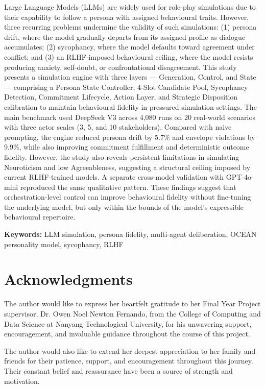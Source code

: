 \documentclass[12pt, a4paper]{report}
\begin{document}
Large Language Models (LLMs) are widely used for role-play simulations due to their capability to follow a persona with assigned behavioural traits. However, three recurring problems undermine the validity of such simulations: (1) persona drift, where the model gradually departs from its assigned profile as dialogue accumulates; (2) sycophancy, where the model defaults toward agreement under conflict; and (3) an RLHF-imposed behavioural ceiling, where the model resists producing anxiety, self-doubt, or confrontational disagreement. This study presents a simulation engine with three layers --- Generation, Control, and State --- comprising a Persona State Controller, 4-Slot Candidate Pool, Sycophancy Detection, Commitment Lifecycle, Action Layer, and Strategic Disposition calibration to maintain behavioural fidelity in pressured simulation settings. The main benchmark used DeepSeek V3 across 4,080 runs on 20 real-world scenarios with three actor scales (3, 5, and 10 stakeholders). Compared with naive prompting, the engine reduced persona drift by 5.7\% and envelope violations by 9.9\%, while also improving commitment fulfillment and deterministic outcome fidelity. However, the study also reveals persistent limitations in simulating Neuroticism and low Agreeableness, suggesting a structural ceiling imposed by current RLHF-trained models. A separate cross-model validation with GPT-4o-mini reproduced the same qualitative pattern. These findings suggest that orchestration-level control can improve behavioural fidelity without fine-tuning the underlying model, but only within the bounds of the model's expressible behavioural repertoire.

\textbf{Keywords:} LLM simulation, persona fidelity, multi-agent deliberation, OCEAN personality model, sycophancy, RLHF

\chapter*{Acknowledgments}

The author would like to express her heartfelt gratitude to her Final Year Project supervisor, Dr. Owen Noel Newton Fernando, from the College of Computing and Data Science at Nanyang Technological University, for his unwavering support, encouragement, and invaluable guidance throughout the course of this project.

The author would also like to extend her deepest appreciation to her family and friends for their patience, support, and encouragement throughout this journey. Their constant belief and reassurance have been a source of strength and motivation.
\end{document}
